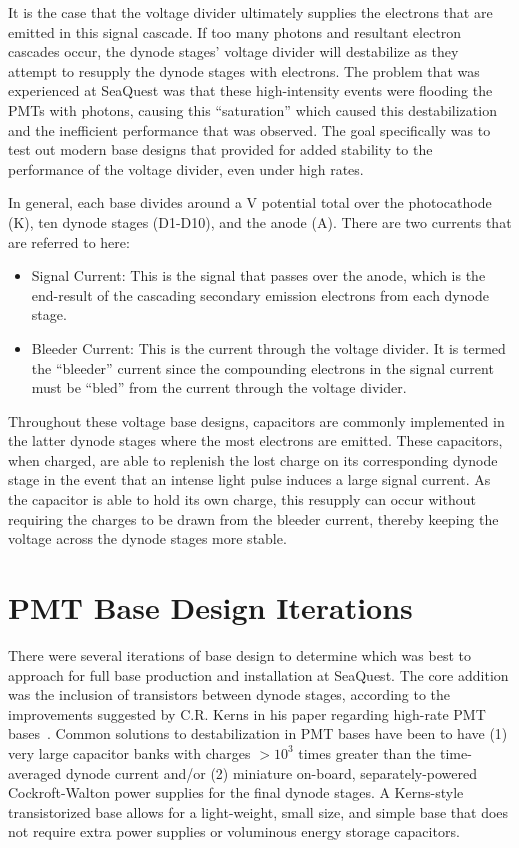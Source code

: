 It is the case that the voltage divider ultimately supplies the electrons that are emitted in this signal cascade. If too many photons and resultant electron cascades occur, the dynode stages' voltage divider will destabilize as they attempt to resupply the dynode stages with electrons. The problem that was experienced at SeaQuest was that these high-intensity events were flooding the PMTs with photons, causing this ``saturation'' which caused this destabilization and the inefficient performance that was observed. The goal specifically was to test out modern base designs that provided for added stability to the performance of the voltage divider, even under high rates.

In general, each base divides around a \unit[-1500]{V} potential total over the photocathode (K), ten dynode stages (D1-D10), and the anode (A). There are two currents that are referred to here:
\begin{itemize}
	\item Signal Current: This is the signal that passes over the anode, which is the end-result of the cascading secondary emission electrons from each dynode stage.
	\item Bleeder Current: This is the current through the voltage divider. It is termed the ``bleeder'' current since the compounding electrons in the signal current must be ``bled'' from the current through the voltage divider.
\end{itemize}

Throughout these voltage base designs, capacitors are commonly implemented in the latter dynode stages where the most electrons are emitted. These capacitors, when charged, are able to replenish the lost charge on its corresponding dynode stage in the event that an intense light pulse induces a large signal current.  As the capacitor is able to hold its own charge, this resupply can occur without requiring the charges to be drawn from the bleeder current, thereby keeping the voltage across the dynode stages more stable.

\section{PMT Base Design Iterations}

There were several iterations of base design to determine which was best to approach for full base production and installation at SeaQuest. The core addition was the inclusion of transistors between dynode stages, according to the improvements suggested by C.R. Kerns in his paper regarding high-rate PMT bases~\cite{Kerns:1977qr}. Common solutions to destabilization in PMT bases have been to have (1) very large capacitor banks with charges $> 10^3$ times greater than the time-averaged dynode current and/or (2) miniature on-board, separately-powered Cockroft-Walton power supplies for the final dynode stages. A Kerns-style transistorized base allows for a light-weight, small size, and simple base that does not require extra power supplies or voluminous energy storage capacitors.

